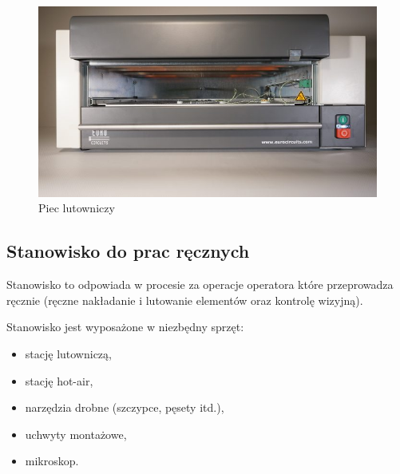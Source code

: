 \begin{figure}[H]
	\centering
	\includegraphics[scale=0.7]{./chapters/chapter2/piec.jpg}
	\caption{Piec lutowniczy}
	\label{piec}
\end{figure}

\subsection{Stanowisko do prac ręcznych}
Stanowisko to odpowiada w procesie za operacje operatora które przeprowadza ręcznie (ręczne nakładanie i lutowanie elementów oraz kontrolę wizyjną).

Stanowisko jest wyposażone w niezbędny sprzęt:
\begin{itemize}
	\item stację lutowniczą,
	\item stację hot-air,
	\item narzędzia drobne (szczypce, pęsety itd.),
	\item uchwyty montażowe,
	\item mikroskop.
\end{itemize}
